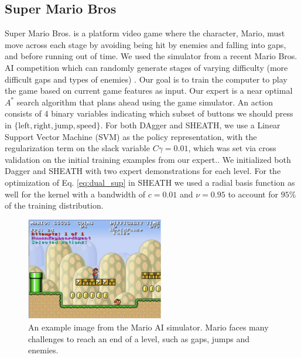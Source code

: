 \documentclass[10pt, conference]{ieeeconf}      %
\begin{document}
\subsection{Super Mario Bros}
Super Mario Bros. is a platform video game where the character, Mario, must move across each stage by avoiding being hit by enemies and falling into gaps, and before running out of time. We used the simulator from a recent Mario Bros. AI competition which can randomly generate stages of varying difficulty (more difficult gaps and types of enemies) \cite{marioAI}. Our goal is to train the computer to play the game based on current game features as input. Our expert is a near optimal $A^*$ search algorithm that plans ahead using the game simulator. An action consists of 4 binary variables indicating which subset of buttons we should press in $\lbrace \mbox{left},\mbox{right},\mbox{jump},\mbox{speed} \rbrace$. For both DAgger and SHEATH, we use a Linear Support Vector Machine (SVM) as the policy representation, with the regularization term on the slack variable $C\gamma=0.01$, which was set via cross validation on the initial training examples from our expert.. We initialized both Dagger and SHEATH with two expert demonstrations for each level. For the optimization of Eq. \ref{eq:dual_sup} in SHEATH we used a radial basis function as well for the kernel with a bandwidth of $c=0.01$ and $\nu = 0.95$ to account for $95\%$ of the training distribution. 

\begin{figure}[t!]
\centering
\includegraphics[width = 6cm ]{figures/mario.png}
\caption{ An example image from the Mario AI simulator. Mario faces many challenges to reach an end of a level, such as gaps, jumps and enemies.  }

\vspace*{-10pt}
\label{fig:dis_traveled}
\end{figure}
\end{document}
